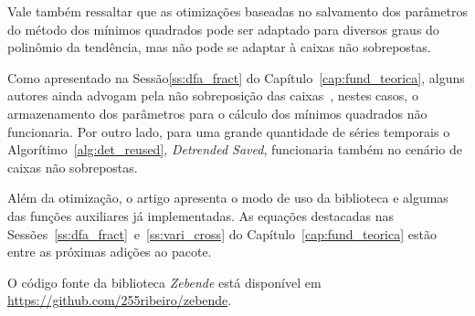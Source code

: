 Vale também ressaltar que as otimizações baseadas no salvamento dos parâmetros do método dos mínimos quadrados pode ser adaptado para diversos graus do polinômio da tendência, mas não pode se adaptar à caixas não sobrepostas.

Como apresentado na Sessão\ref{ss:dfa_fract} do Capítulo~\ref{cap:fund_teorica}, alguns autores ainda advogam pela não sobreposição das caixas~\cite{zhouMultifractalDetrendedCrosscorrelation2008}, nestes casos, o armazenamento dos parâmetros para o cálculo dos mínimos quadrados não funcionaria. Por outro lado, para uma grande quantidade de séries temporais o Algorítimo~\ref{alg:det_reused}, \emph{Detrended Saved}, funcionaria também no cenário de caixas não sobrepostas.

Além da otimização, o artigo apresenta o modo de uso da biblioteca e algumas das funções auxiliares já implementadas. As equações destacadas nas Sessões~\ref{ss:dfa_fract}~e~\ref{ss:vari_cross} do Capítulo~\ref{cap:fund_teorica} estão entre as próximas adições ao pacote.

O código fonte da biblioteca \emph{Zebende} está disponível em \url{https://github.com/255ribeiro/zebende}.


    